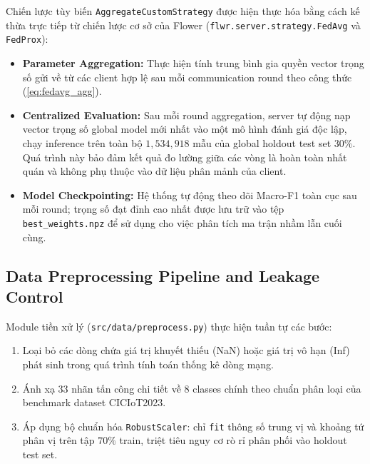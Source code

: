Chiến lược tùy biến \texttt{AggregateCustomStrategy} được hiện thực hóa bằng cách kế thừa trực tiếp từ chiến lược cơ sở của Flower (\texttt{flwr.server.strategy.FedAvg} và \texttt{FedProx}):
\begin{itemize}
    \item \textbf{Parameter Aggregation:} Thực hiện tính trung bình gia quyền vector trọng số gửi về từ các client hợp lệ sau mỗi communication round theo công thức (\ref{eq:fedavg_agg}).
    \item \textbf{Centralized Evaluation:} Sau mỗi round aggregation, server tự động nạp vector trọng số global model mới nhất vào một mô hình đánh giá độc lập, chạy inference trên toàn bộ $1,534,918$ mẫu của global holdout test set $30\%$. Quá trình này bảo đảm kết quả đo lường giữa các vòng là hoàn toàn nhất quán và không phụ thuộc vào dữ liệu phân mảnh của client.
    \item \textbf{Model Checkpointing:} Hệ thống tự động theo dõi Macro-F1 toàn cục sau mỗi round; trọng số đạt đỉnh cao nhất được lưu trữ vào tệp \texttt{best\_weights.npz} để sử dụng cho việc phân tích ma trận nhầm lẫn cuối cùng.
\end{itemize}

\subsection{Data Preprocessing Pipeline and Leakage Control}
Module tiền xử lý (\texttt{src/data/preprocess.py}) thực hiện tuần tự các bước:
\begin{enumerate}
    \item Loại bỏ các dòng chứa giá trị khuyết thiếu (NaN) hoặc giá trị vô hạn (Inf) phát sinh trong quá trình tính toán thống kê dòng mạng.
    \item Ánh xạ 33 nhãn tấn công chi tiết về 8 classes chính theo chuẩn phân loại của benchmark dataset CICIoT2023.
    \item Áp dụng bộ chuẩn hóa \texttt{RobustScaler}: chỉ \texttt{fit} thông số trung vị và khoảng tứ phân vị trên tập $70\%$ train, triệt tiêu nguy cơ rò rỉ phân phối vào holdout test set.
\end{enumerate}

